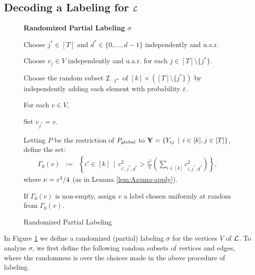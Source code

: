 \subsection{Decoding a Labeling for $\mathcal{L}$}

\begin{figure}[t]
\begin{mdframed}
\begin{center} \textbf{Randomized Partial Labeling $\sigma$} \end{center}  
\begin{enumerate*}
\item Choose $j^* \in [T]$ and $d^* \in \{0,\dots, d-1\}$
independently and u.a.r.
\item Choose $v_j \in V$ independently and u.a.r. for each $j \in
[T]\setminus\{j^*\}$.
\item Choose the random subset $\mathcal{I}_{-j^*}$ of $[k]\times ([T]\setminus
\{j^*\})$ by independently adding each element with probability $\varepsilon$.   
\item For each $v \in V$, \\[-1.5em]
\begin{enumerate*}
\item Set $v_{j^*} = v$.
\item Letting $P$ be the restriction of $P_{\textnormal{global}}$ to 
${\bf Y} = \{Y_{ij}\,\mid\, i\in[k], j \in [T]\}$, define
the set:
\begin{eqnarray}
\Gamma_0(v) & := & \left\{i' \in [k]\,\mid\, c_{i',j^*,d^*}^2 >
\frac{\nu^2}{4}\left(\sum_{i \in [k]} c_{i,j^*,d^*}^2\right)\right\},
\label{eqn-Gamma-0} 
\end{eqnarray} 
where $\nu = \varepsilon^2/4$ (as in Lemma \ref{lem:Azuma-apply}). 
\item If $\Gamma_0(v)$ is non-empty, assign $v$ a label chosen
uniformly at random from $\Gamma_0(v)$.
\end{enumerate*}
\end{enumerate*}
\end{mdframed}
\caption{Randomized Partial Labeling}
\label{fig:labeling}
\end{figure}
In Figure \ref{fig:labeling} we define a randomized (partial) labeling $\sigma$ 
for the vertices $V$ of $\mathcal{L}$.
To analyze $\sigma$, we first define the
following random subsets of vertices and edges, where the randomness
is over the choices made in the above procedure of labeling.

